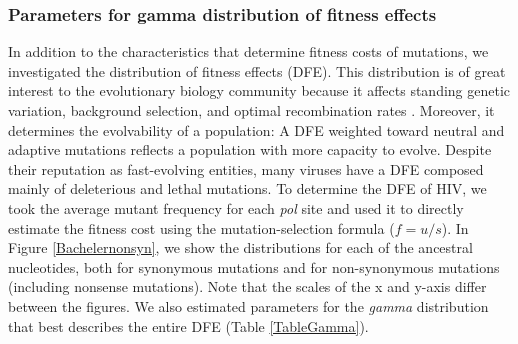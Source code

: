 \documentclass{article}
\begin{document}
\subsubsection*{Parameters for gamma distribution of fitness effects}
In addition to the characteristics that determine fitness costs of mutations, we investigated the distribution of fitness effects (DFE). This distribution is of great interest to the evolutionary biology community because it affects standing genetic variation, background selection, and optimal recombination rates \cite{eyre2007distribution}. Moreover, it determines the evolvability of a population: A DFE weighted toward neutral and adaptive mutations reflects a population with more capacity to evolve. Despite their reputation as fast-evolving entities, many viruses have a DFE composed mainly of deleterious and lethal mutations. 
To determine the DFE of HIV, we took the average mutant frequency for each \textit {pol} site and used it to directly estimate the fitness cost using the  mutation-selection formula ($f = u / s$). 
In Figure \ref{Bachelernonsyn}, we show the distributions for each of the ancestral nucleotides, both for synonymous mutations and for non-synonymous mutations (including nonsense mutations). Note that the scales of the x and y-axis differ between the figures. 
We also estimated parameters for the \textit {gamma} distribution that best describes the entire DFE 
(Table \ref{TableGamma}). 

\end{document}
